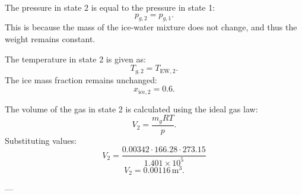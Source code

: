 The pressure in state 2 is equal to the pressure in state 1:  
\[
p_{g,2} = p_{g,1}.
\]  
This is because the mass of the ice-water mixture does not change, and thus the weight remains constant.  

The temperature in state 2 is given as:  
\[
T_{g,2} = T_{\text{EW},2}.
\]  
The ice mass fraction remains unchanged:  
\[
x_{\text{ice},2} = 0.6.
\]  

The volume of the gas in state 2 is calculated using the ideal gas law:  
\[
V_2 = \frac{m_g RT}{p}.
\]  
Substituting values:  
\[
V_2 = \frac{0.00342 \cdot 166.28 \cdot 273.15}{1.401 \times 10^5}
\]  
\[
V_2 = 0.00116 \, \text{m}^3.
\]  

---